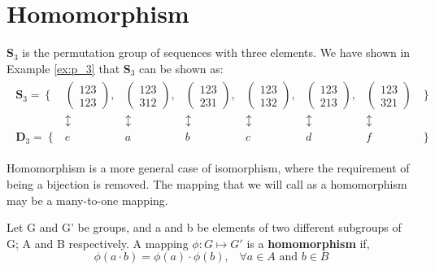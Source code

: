 \section{Homomorphism} 
\label{homomorphism}

\begin{example}
$\mathbf{S}_3$ is the permutation group of sequences with three elements. We have shown in Example \ref{ex:p_3} that $\mathbf{S}_3$ can be shown as: 
\begin{align}
\begin{array}{cccccccc}
\mathbf{S}_3 = \left\lbrace \right. & \left(\begin{matrix}123\\123\end{matrix}\right),& \left(\begin{matrix}123\\312\end{matrix}\right), & \left(\begin{matrix}123\\231\end{matrix}\right), & \left(\begin{matrix}123\\132\end{matrix}\right), & \left(\begin{matrix}123\\213\end{matrix}\right), & \left(\begin{matrix}123\\321\end{matrix}\right) & \left. \right\rbrace \\ 
& \updownarrow &\updownarrow &\updownarrow &\updownarrow &\updownarrow &\updownarrow & \\
\mathbf{D}_3 = \left\lbrace \right. & e & a & b & c & d & f & \left. \right\rbrace 
\end{array} 
\end{align}
\end{example}
 
Homomorphism is a more general case of isomorphism, where the requirement of being a bijection is removed. The mapping that we will call as a homomorphism may be a many-to-one mapping.\cite{armstrong_groups_1988}

\begin{definition}[Homomorphism]
\label{def:homomorphism}
Let G and G' be groups, and a and b be elements of two different subgroups of G; A and B respectively. A mapping $\phi : G \mapsto G'$ is a \textbf{homomorphism} if,
\cite{rosen_symmetry_1995,armstrong_groups_1988}
\[\phi(a\cdot b) = \phi(a) \cdot \phi(b), \;\;\; \forall a \in A \text{ and } b \in B \]
\end{definition}


